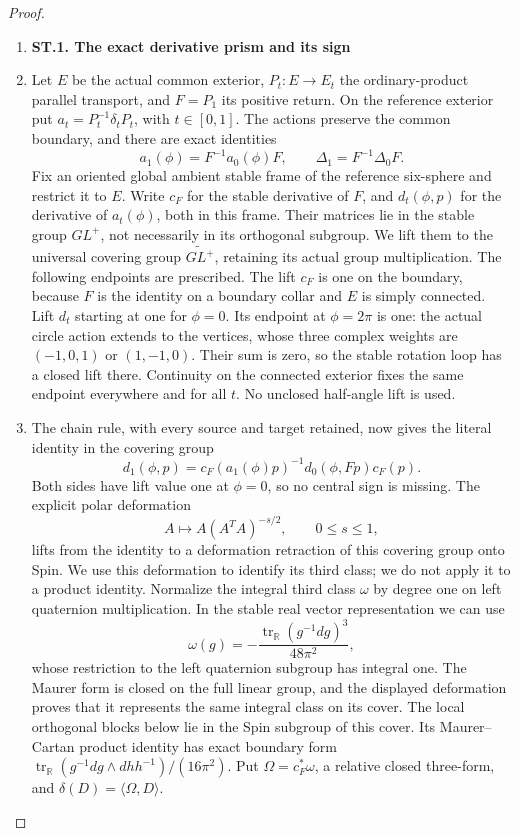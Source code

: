 \begin{proof}
\begin{enumerate}[label=\arabic*.]
\item \par

\medskip\noindent\textbf{ST.1. The exact derivative prism and its sign}

\par\nobreak

\item Let \(E\) be the actual common exterior, \(P_t:E\to E_t\) the
ordinary-product parallel transport, and \(F=P_1\) its positive
return. On the reference exterior put
\(a_t=P_t^{-1}\delta_tP_t\), with \(t\in[0,1]\). The actions
preserve the common boundary, and there are exact identities
\[
 a_1(\phi)=F^{-1}a_0(\phi)F,\qquad
 \Delta_1=F^{-1}\Delta_0F.                            \tag{ST.1}
\]
Fix an oriented global ambient stable frame of the reference
six-sphere and restrict it to \(E\). Write \(c_F\) for the stable
derivative of \(F\), and \(d_t(\phi,p)\) for the derivative of
\(a_t(\phi)\), both in this frame. Their matrices lie in the stable group
\(GL^+\), not necessarily in its orthogonal subgroup. We lift them
to the universal covering group \(\widetilde{GL^+}\), retaining
its actual group multiplication. The following endpoints are
prescribed. The lift \(c_F\) is one on the
boundary, because \(F\) is the identity on a boundary collar and
\(E\) is simply connected. Lift \(d_t\) starting at one for
\(\phi=0\). Its endpoint at \(\phi=2\pi\) is one: the actual
circle action extends to the vertices, whose three complex weights
are \((-1,0,1)\) or \((1,-1,0)\). Their sum is zero, so the
stable rotation loop has a closed lift there. Continuity on the
connected exterior fixes the same endpoint everywhere and for all
\(t\). No unclosed half-angle lift is used.

\item The chain rule, with every source and target retained, now gives
the literal identity in the covering group
\[
 d_1(\phi,p)=c_F(a_1(\phi)p)^{-1}
                    d_0(\phi,Fp)c_F(p).              \tag{ST.2}
\]
Both sides have lift value one at \(\phi=0\), so no central sign is
missing. The explicit polar deformation
\[
 A\longmapsto A(A^T A)^{-s/2},\qquad 0\leq s\leq1,
\]
lifts from the identity to a deformation retraction of this covering
group onto Spin. We use this deformation to identify its third
class; we do not apply it to a product identity. Normalize the
integral third class \(\omega\) by degree one on left quaternion
multiplication. In the
stable real vector representation we can use
\[
 \omega(g)=-\frac{\operatorname{tr}_{\mathbb R}
                         (g^{-1}dg)^3}{48\pi^2},
\]
whose restriction to the left quaternion subgroup has integral one.
The Maurer form is closed on the full linear group, and the displayed
deformation proves that it represents the same integral class on
its cover. The local orthogonal blocks below lie in the Spin
subgroup of this cover.
Its Maurer--Cartan product identity has exact boundary form
\(\operatorname{tr}_{\mathbb R}(g^{-1}dg\wedge dhh^{-1})/(16\pi^2)\).
Put \(\Omega=c_F^*\omega\), a relative closed three-form, and
\(\delta(D)=\langle\Omega,D\rangle\).


\end{enumerate}
\end{proof}
